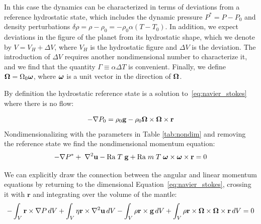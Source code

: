 \documentclass[extra,mreferee]{gji}
\begin{document}
In this case the dynamics can be characterized in terms of deviations from a reference hydrostatic state, which includes the dynamic pressure $P^* = P - P_0$ and density perturbations $\delta \rho = \rho- \rho_0 = - \rho_0 \alpha (T-T_0)$.
In addition, we expect deviations in the figure of the planet from its hydrostatic shape, which we denote by $V = V_H + \Delta V$, where $V_H$ is the hydrostatic figure and $\Delta V$ is the deviation.
The introduction of $\Delta V$ requires another nondimensional number to characterize it, and we find that the quantity $\Gamma \equiv \alpha \Delta T$ is convenient.
Finally, we define $\mitbf{\Omega} = \Omega_0 \mitbf{\omega}$, where $\mitbf{\omega}$ is a unit vector in the direction of $\mitbf{\Omega}$.

By definition the hydrostatic reference state is a solution to~\eqref{eq:navier_stokes} where there is no flow:

\begin{equation}
\begin{aligned}
- \nabla P_0 =  \rho_0 \mathbf{g} -  \rho_0 \mitbf{\Omega} \times \mitbf{\Omega} \times \mathbf{r}
\label{eq:hydrostatic}
\end{aligned}
\end{equation}
Nondimensionalizing with the parameters in Table \ref{tab:nondim} and removing the reference state we find the nondimensional momentum equation:
\begin{equation}
\begin{aligned}
 - \nabla P^* + \; \nabla^2 \mathbf{u} - \mathrm{Ra} \; T \; \mathbf{g} + \mathrm{Ra} \; m \; T \;{\mitbf{\omega} \times \mitbf{\omega} \times \mathbf{r}} = 0
\end{aligned}
\end{equation}

We can explicitly draw the connection between the angular and linear momentum equations by returning to the dimensional
Equation~\eqref{eq:navier_stokes}, crossing it with $\mathbf{r}$ and integrating over the volume of the mantle:
\begin{equation}
\begin{aligned}
-\int_V \mathbf{r} \times \nabla P \,dV + \int_V \eta \mathbf{r} \times \nabla^2 \mathbf{u} \,dV - \int_V \rho \mathbf{r} \times \mathbf{g} \,dV 
   + \int_V \rho \mathbf{r} \times \mitbf{\Omega} \times \mitbf{\Omega} \times \mathbf{r}  \,dV &= 0 \\
\end{aligned}
\end{equation}
\end{document}
